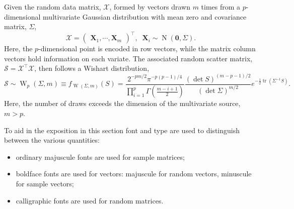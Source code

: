 \documentclass[12pt, twoside, draft]{article}
\begin{document}
Given the random data matrix, $\mathcal{X}$, formed by vectors drawn $m$ times from a $p$-dimensional multivariate Gaussian distribution with mean zero and covariance matrix, $\Sigma$, 
\begin{equation}
\mathcal{X} = \begin{pmatrix} \mathbf{X}_1, \cdots, \mathbf{X}_m \end{pmatrix}^\top, \;\; \mathbf{X}_i \sim \operatorname{N}(\mathbf{0}, \Sigma).
\end{equation}
Here, the $p$-dimensional point is encoded in row vectors, while the matrix column vectors hold information on each variate.  The associated random scatter matrix, $\mathcal{S} = \mathcal{X}^\top \mathcal{X}$, then follows a Wishart distribution,
\begin{equation}\label{eq:Wishart_pdf}
\mathcal{S} \sim \operatorname{W}_p(\Sigma, m )\equiv f_{\operatorname{W}(\Sigma, m)}(S) =
\frac{2^{-pm/2} \pi^{-p(p-1)/4} }{\prod_{i=1}^p \Gamma \left( \frac{m-i+1}{2} \right) }
\frac{(\operatorname{det} S)^{(m-p-1)/2}}{(\operatorname{det} \Sigma)^{m/2}} e^{-\frac{1}{2} \operatorname{tr}(\Sigma^{-1} S)}.
\end{equation}
Here, the number of draws exceeds the dimension of the multivariate source, $m > p$.  

To aid in the exposition in this section font and type are used to distinguish between the various quantities:

\begin{itemize}[noitemsep]
\item ordinary majuscule fonts are used for sample matrices;
\item boldface fonts are used for vectors: majuscule for random vectors, minuscule for sample vectors;
\item calligraphic fonts are used for random matrices.
\end{itemize}
\end{document}
